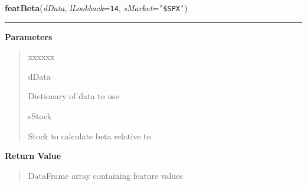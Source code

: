\hspace{.8\funcindent}\begin{boxedminipage}{\funcwidth}

    \raggedright \textbf{featBeta}(\textit{dData}, \textit{lLookback}={\tt 14}, \textit{sMarket}={\tt \texttt{'}\texttt{\$SPX}\texttt{'}})

    \vspace{-1.5ex}

    \rule{\textwidth}{0.5\fboxrule}
\setlength{\parskip}{2ex}
\setlength{\parskip}{1ex}
      \textbf{Parameters}
      \vspace{-1ex}

      \begin{quote}
        \begin{Ventry}{xxxxxx}

          \item[dData]

          Dictionary of data to use

          \item[sStock]

          Stock to calculate beta relative to

        \end{Ventry}

      \end{quote}

      \textbf{Return Value}
    \vspace{-1ex}

      \begin{quote}
      DataFrame array containing feature values

      \end{quote}

    \end{boxedminipage}

    \label{QSTK:qstkfeat:features:featBollinger}

    \vspace{0.5ex}

